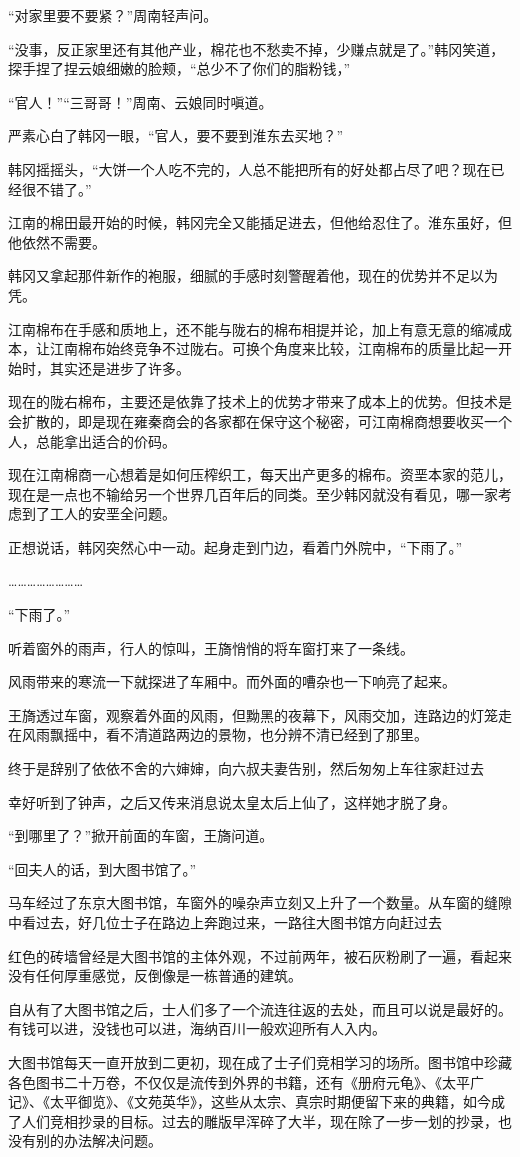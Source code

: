 “对家里要不要紧？”周南轻声问。

“没事，反正家里还有其他产业，棉花也不愁卖不掉，少赚点就是了。”韩冈笑道，探手捏了捏云娘细嫩的脸颊，“总少不了你们的脂粉钱，”

“官人！”“三哥哥！”周南、云娘同时嗔道。

严素心白了韩冈一眼，“官人，要不要到淮东去买地？”

韩冈摇摇头，“大饼一个人吃不完的，人总不能把所有的好处都占尽了吧？现在已经很不错了。”

江南的棉田最开始的时候，韩冈完全又能插足进去，但他给忍住了。淮东虽好，但他依然不需要。

韩冈又拿起那件新作的袍服，细腻的手感时刻警醒着他，现在的优势并不足以为凭。

江南棉布在手感和质地上，还不能与陇右的棉布相提并论，加上有意无意的缩减成本，让江南棉布始终竞争不过陇右。可换个角度来比较，江南棉布的质量比起一开始时，其实还是进步了许多。

现在的陇右棉布，主要还是依靠了技术上的优势才带来了成本上的优势。但技术是会扩散的，即是现在雍秦商会的各家都在保守这个秘密，可江南棉商想要收买一个人，总能拿出适合的价码。

现在江南棉商一心想着是如何压榨织工，每天出产更多的棉布。资垩本家的范儿，现在是一点也不输给另一个世界几百年后的同类。至少韩冈就没有看见，哪一家考虑到了工人的安垩全问题。

正想说话，韩冈突然心中一动。起身走到门边，看着门外院中，“下雨了。”

……………………

“下雨了。”

听着窗外的雨声，行人的惊叫，王旖悄悄的将车窗打来了一条线。

风雨带来的寒流一下就探进了车厢中。而外面的嘈杂也一下响亮了起来。

王旖透过车窗，观察着外面的风雨，但黝黑的夜幕下，风雨交加，连路边的灯笼走在风雨飘摇中，看不清道路两边的景物，也分辨不清已经到了那里。

终于是辞别了依依不舍的六婶婶，向六叔夫妻告别，然后匆匆上车往家赶过去

幸好听到了钟声，之后又传来消息说太皇太后上仙了，这样她才脱了身。

“到哪里了？”掀开前面的车窗，王旖问道。

“回夫人的话，到大图书馆了。”

马车经过了东京大图书馆，车窗外的噪杂声立刻又上升了一个数量。从车窗的缝隙中看过去，好几位士子在路边上奔跑过来，一路往大图书馆方向赶过去

红色的砖墙曾经是大图书馆的主体外观，不过前两年，被石灰粉刷了一遍，看起来没有任何厚重感觉，反倒像是一栋普通的建筑。

自从有了大图书馆之后，士人们多了一个流连往返的去处，而且可以说是最好的。有钱可以进，没钱也可以进，海纳百川一般欢迎所有人入内。

大图书馆每天一直开放到二更初，现在成了士子们竞相学习的场所。图书馆中珍藏各色图书二十万卷，不仅仅是流传到外界的书籍，还有《册府元龟》、《太平广记》、《太平御览》、《文苑英华》，这些从太宗、真宗时期便留下来的典籍，如今成了人们竞相抄录的目标。过去的雕版早浑碎了大半，现在除了一步一划的抄录，也没有别的办法解决问题。

